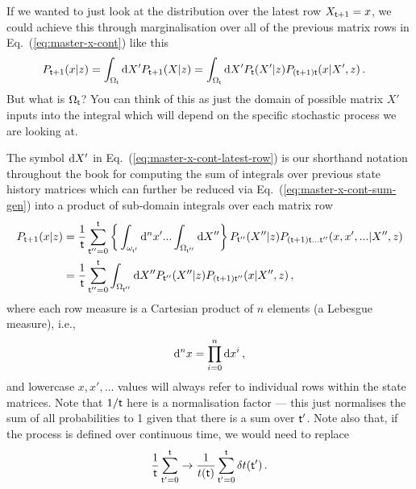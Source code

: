 If we wanted to just look at the distribution over the latest row $X_{{\sf t}+1}=x$, we could achieve this through marginalisation over all of the previous matrix rows in Eq.~(\ref{eq:master-x-cont}) like this
\begin{align}
P_{{\sf t}+1}(x\vert z) = \int_{\Omega_{{\sf t}}}{\rm d}X' P_{{\sf t}+1}(X\vert z) &= \int_{\Omega_{{\sf t}}}{\rm d}X' P_{{\sf t}}(X'\vert z) P_{({\sf t}+1){\sf t}}(x\vert X',z) \label{eq:master-x-cont-latest-row} \,.
\end{align}
But what is $\Omega_{\sf t}$? You can think of this as just the domain of possible matrix $X'$ inputs into the integral which will depend on the specific stochastic process we are looking at. 

The symbol ${\rm d}X'$ in Eq.~(\ref{eq:master-x-cont-latest-row}) is our shorthand notation throughout the book for computing the sum of integrals over previous state history matrices which can further be reduced via Eq.~(\ref{eq:master-x-cont-sum-gen}) into a product of sub-domain integrals over each matrix row
\begin{align}
P_{{\sf t}+1}(x\vert z) &= \frac{1}{{\sf t}}\sum_{{\sf t}''=0}^{{\sf t}} \bigg\lbrace \int_{\omega_{{\sf t}'}}{\rm d}^nx'...\int_{\Omega_{{\sf t}''}}{\rm d}X'' \bigg\rbrace \,P_{{\sf t}''}(X''\vert z) P_{({\sf t}+1){\sf t}\dots{\sf t}''}(x,x',... \vert X'',z) \\
&= \frac{1}{{\sf t}}\sum_{{\sf t}''=0}^{{\sf t}} \int_{\Omega_{{\sf t}''}}{\rm d}X'' P_{{\sf t}''}(X''\vert z) P_{({\sf t}+1){\sf t}''}(x \vert X'',z) \label{eq:master-x-cont-latest-row-gen} \,,
\end{align}
where each row measure is a Cartesian product of $n$ elements (a Lebesgue measure), i.e.,
\begin{align}
{\rm d}^nx = \prod_{i=0}^n{\rm d}x^i \,,
\end{align}
and lowercase $x, x', \dots$ values will always refer to individual rows within the state matrices. Note that $1/{\sf t}$ here is a normalisation factor --- this just normalises the sum of all probabilities to 1 given that there is a sum over ${\sf t}'$. Note also that, if the process is defined over continuous time, we would need to replace 
\begin{align}
\frac{1}{{\sf t}}\sum_{{\sf t}'=0}^{{\sf t}} \rightarrow \frac{1}{t({\sf t})}\sum_{{\sf t}'=0}^{{\sf t}}\delta t({\sf t}') \,.
\end{align}


